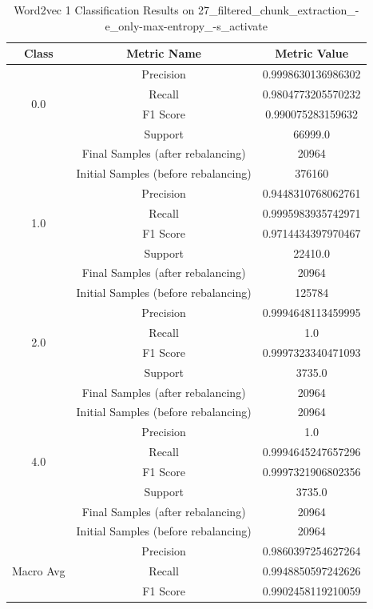 \begin{longtable}{|c|c|c|}
\caption{Word2vec 1 Classification Results on 27\_filtered\_chunk\_extraction\_-e\_only-max-entropy\_-s\_activate} \label{tab:27_filtered_chunk_extraction_-e_only-max-entropy_-s_activate_word2vec_1_classifiers_results} \\
\hline
Class & Metric Name & Metric Value \\
\hline
\multirow{4}{*}{0.0} & Precision & 0.9998630136986302 \\
 & Recall & 0.9804773205570232 \\
 & F1 Score & 0.990075283159632 \\
 & Support & 66999.0 \\
 & Final Samples (after rebalancing) & 20964 \\
 & Initial Samples (before rebalancing) & 376160 \\
\hline
\multirow{4}{*}{1.0} & Precision & 0.9448310768062761 \\
 & Recall & 0.9995983935742971 \\
 & F1 Score & 0.9714434397970467 \\
 & Support & 22410.0 \\
 & Final Samples (after rebalancing) & 20964 \\
 & Initial Samples (before rebalancing) & 125784 \\
\hline
\multirow{4}{*}{2.0} & Precision & 0.9994648113459995 \\
 & Recall & 1.0 \\
 & F1 Score & 0.9997323340471093 \\
 & Support & 3735.0 \\
 & Final Samples (after rebalancing) & 20964 \\
 & Initial Samples (before rebalancing) & 20964 \\
\hline
\multirow{4}{*}{4.0} & Precision & 1.0 \\
 & Recall & 0.9994645247657296 \\
 & F1 Score & 0.9997321906802356 \\
 & Support & 3735.0 \\
 & Final Samples (after rebalancing) & 20964 \\
 & Initial Samples (before rebalancing) & 20964 \\
\hline
\multirow{4}{*}{Macro Avg} & Precision & 0.9860397254627264 \\
 & Recall & 0.9948850597242626 \\
 & F1 Score & 0.9902458119210059 \\

\end{longtable}
